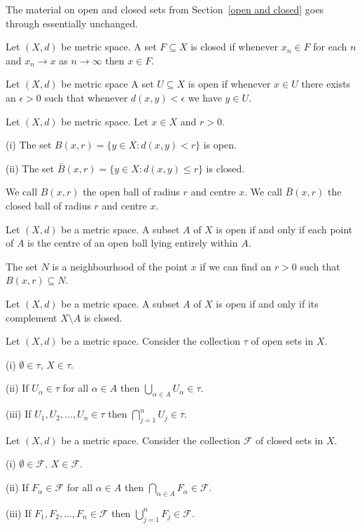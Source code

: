 The material on open and closed sets from 
Section~\ref{open and closed} goes through 
essentially unchanged.
\begin{definition} Let $(X,d)$ be metric space.
A set $F\subseteq X$
is closed if whenever $x_{n}\in F$ for each
$n$ and $x_{n}\rightarrow x$
as $n\rightarrow\infty$ then $x\in F$.
\end{definition}
\begin{definition} Let $(X,d)$ be metric space
A set $U\subseteq X$
is open if whenever $x\in U$ there exists
an $\epsilon>0$ such that whenever
$d(x,y)<\epsilon$ we
have $y\in U$.
\end{definition}
\begin{example} Let $(X,d)$ be metric space.
Let $x\in X$ and $r>0$. 

(i) The set $B(x,r)
=\{y\in X:d(x,y)<r\}$ is open.

(ii) The set $\bar{B}(x,r)
=\{y\in X:d(x,y)\leq r\}$ is closed.
\end{example}
We call $B(x,r)$ the open ball of radius $r$
and centre $x$.
We call $\bar{B}(x,r)$ the closed ball of radius $r$
and centre $x$.
\begin{lemma} Let $(X,d)$ be a metric space.
A subset $A$ of $X$ is open
if and only if each point of $A$ is the centre of
an open ball lying entirely within $A$.
\end{lemma}
\begin{definition} The set $N$ is a neighbourhood
of the point $x$ if we can find an $r>0$
such that $B(x,r)\subseteq N$.
\end{definition}
\begin{lemma}\label{complement open metric}
Let $(X,d)$ be a metric space.
A subset $A$ of $X$ is open
if and only if its complement $X\setminus A$
is closed.
\end{lemma}
\begin{lemma}\label{open familly metric}
Let $(X,d)$ be a metric space. 
Consider the collection $\tau$ of open sets
in $X$.

(i) $\emptyset\in\tau$, $X\in \tau$.

(ii)  If $U_{\alpha}\in\tau$ for all $\alpha\in A$ then
$\bigcup_{\alpha\in A} U_{\alpha}\in\tau$.

(iii) If $U_{1},U_{2},\dots,U_{n}\in\tau$ then
$\bigcap_{j=1}^{n}U_{j}\in\tau$.
\end{lemma}
\begin{lemma}\label{closed familly metric}
Let $(X,d)$ be a metric space.
Consider the collection $\mathcal{F}$ of closed sets
in $X$.

(i) $\emptyset\in\mathcal{F}$, $X\in \mathcal{F}$.

(ii)  If $F_{\alpha}\in\mathcal{F}$ for all $\alpha\in A$ then
$\bigcap_{\alpha\in A} F_{\alpha}\in\mathcal{F}$.

(iii) If $F_{1},F_{2},\dots,F_{n}\in\mathcal{F}$ then
$\bigcup_{j=1}^{n}F_{j}\in\mathcal{F}$.
\end{lemma}
 
